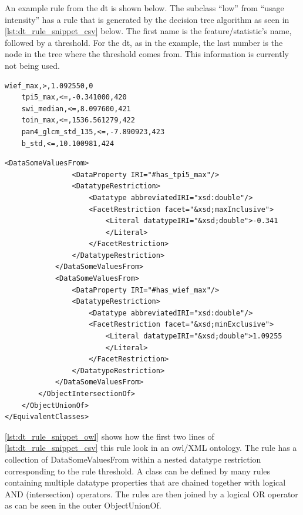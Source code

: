\documentclass[authoryear,review,12pt,number]{elsarticle}
\begin{document}
An example rule from the \gls{dt} is shown below. The subclass ``low'' from 
``usage intensity'' has a rule that is generated by the decision tree algorithm 
as seen in \ref{lst:dt_rule_snippet_csv} below. The first name is the 
feature/statistic's name, followed by a threshold. For the \gls{dt}, as in the 
example, the last number is the node in the tree where the threshold comes 
from. This information is currently not being used.
\lstset{language=XML,tabsize=2, label=lst:dt_rule_snippet_csv, caption=\lstname}
\begin{lstlisting}[frame=single]
    wief_max,>,1.092550,0
    tpi5_max,<=,-0.341000,420
    swi_median,<=,8.097600,421
    toin_max,<=,1536.561279,422
    pan4_glcm_std_135,<=,-7.890923,423
    b_std,<=,10.100981,424
\end{lstlisting}

\lstset{basicstyle=\footnotesize,language=XML,tabsize=2,
label=lst:dt_rule_snippet_owl , caption=\lstname, breaklines=true}
\begin{lstlisting}[frame=single,fontadjust]
            <DataSomeValuesFrom>
                <DataProperty IRI="#has_tpi5_max"/>
                <DatatypeRestriction>
                    <Datatype abbreviatedIRI="xsd:double"/>
                    <FacetRestriction facet="&xsd;maxInclusive">
                        <Literal datatypeIRI="&xsd;double">-0.341
                        </Literal>
                    </FacetRestriction>
                </DatatypeRestriction>
            </DataSomeValuesFrom>
            <DataSomeValuesFrom>
                <DataProperty IRI="#has_wief_max"/>
                <DatatypeRestriction>
                    <Datatype abbreviatedIRI="xsd:double"/>
                    <FacetRestriction facet="&xsd;minExclusive">
                        <Literal datatypeIRI="&xsd;double">1.09255
                        </Literal>
                    </FacetRestriction>
                </DatatypeRestriction>
            </DataSomeValuesFrom>
        </ObjectIntersectionOf>
    </ObjectUnionOf>
</EquivalentClasses>
\end{lstlisting}

\ref{lst:dt_rule_snippet_owl} shows how the first two lines of 
\ref{lst:dt_rule_snippet_csv} this rule look in an \gls{owl}/XML ontology. The 
rule has a collection of DataSomeValuesFrom within a nested datatype 
restriction 
corresponding to the rule threshold. A class can be defined by many rules 
containing multiple datatype properties that are chained together with logical 
AND (intersection) operators. The rules are then joined by a logical OR 
operator 
as can be seen in the outer ObjectUnionOf. 
\end{document}
